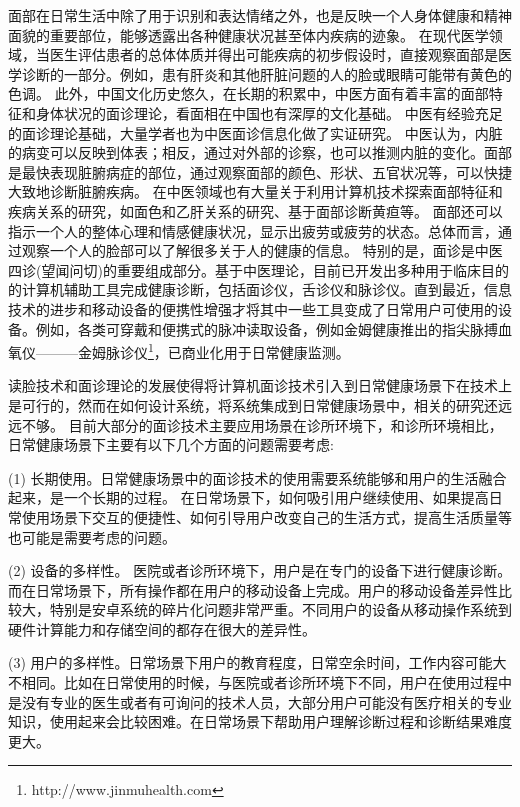 面部在日常生活中除了用于识别和表达情绪之外，也是反映一个人身体健康和精神面貌的重要部位，能够透露出各种健康状况甚至体内疾病的迹象。
在现代医学领域，当医生评估患者的总体体质并得出可能疾病的初步假设时，直接观察面部是医学诊断的一部分\cite{Clifford2006Shortliffe}。例如，患有肝炎和其他肝脏问题的人的脸或眼睛可能带有黄色的色调\cite{Li2008Therapeutic}。
此外，中国文化历史悠久，在长期的积累中，中医方面有着丰富的面部特征和身体状况的面诊理论，看面相在中国也有深厚的文化基础。
中医有经验充足的面诊理论基础，大量学者也为中医面诊信息化做了实证研究。
中医认为，内脏的病变可以反映到体表；相反，通过对外部的诊察，也可以推测内脏的变化\cite{杨淑芳2002伤寒六经辨证初探}。面部是最快表现脏腑病症的部位，通过观察面部的颜色、形状、五官状况等，可以快捷大致地诊断脏腑疾病。
在中医领域也有大量关于利用计算机技术探索面部特征和疾病关系的研究，如面色和乙肝关系的研究\cite{杨宏志2007慢性乙型肝炎肝硬化中医面部五色诊断与临床病理的相关性研究}、基于面部诊断黄疸\cite{艾英1998黄疸病人面部色泽定量实验研究}等。
面部还可以指示一个人的整体心理和情感健康状况，显示出疲劳或疲劳的状态。总体而言，通过观察一个人的脸部可以了解很多关于人的健康的信息。
特别的是，面诊是中医四诊(望闻问切)的重要组成部分。基于中医理论，目前已开发出多种用于临床目的的计算机辅助工具完成健康诊断，包括面诊仪\cite{Liu2014Computerized}，舌诊仪\cite{Wang2004An}和脉诊仪\cite{Shu2007Developing}。直到最近，信息技术的进步和移动设备的便携性增强才将其中一些工具变成了日常用户可使用的设备。例如，各类可穿戴和便携式的脉冲读取设备，例如金姆健康推出的指尖脉搏血氧仪———金姆脉诊仪\footnote{http://www.jinmuhealth.com}，已商业化用于日常健康监测。


读脸技术和面诊理论的发展使得将计算机面诊技术引入到日常健康场景下在技术上是可行的，然而在如何设计系统，将系统集成到日常健康场景中，相关的研究还远远不够。
目前大部分的面诊技术主要应用场景在诊所环境下，和诊所环境相比，日常健康场景下主要有以下几个方面的问题需要考虑: 

(1) 长期使用。日常健康场景中的面诊技术的使用需要系统能够和用户的生活融合起来，是一个长期的过程。 在日常场景下，如何吸引用户继续使用、如果提高日常使用场景下交互的便捷性、如何引导用户改变自己的生活方式，提高生活质量等也可能是需要考虑的问题。

(2) 设备的多样性。 医院或者诊所环境下，用户是在专门的设备下进行健康诊断。而在日常场景下，所有操作都在用户的移动设备上完成。用户的移动设备差异性比较大，特别是安卓系统的碎片化问题非常严重。不同用户的设备从移动操作系统到硬件计算能力和存储空间的都存在很大的差异性。

(3) 用户的多样性。日常场景下用户的教育程度，日常空余时间，工作内容可能大不相同。比如在日常使用的时候，与医院或者诊所环境下不同，用户在使用过程中是没有专业的医生或者有可询问的技术人员，大部分用户可能没有医疗相关的专业知识，使用起来会比较困难。在日常场景下帮助用户理解诊断过程和诊断结果难度更大。


